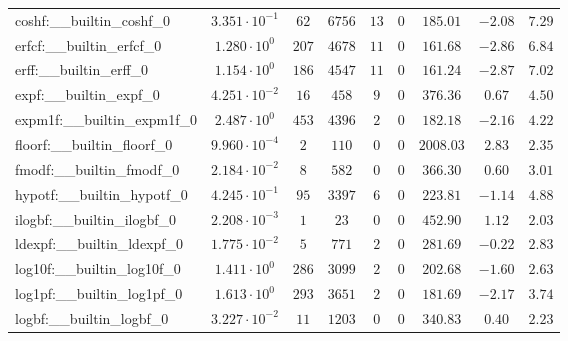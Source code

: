 \begin{tabular}{|l|c|c|c|c|c|c|c|c|}
coshf:\_\_builtin\_coshf\_0               & $ 3.351 \cdot 10^{-1} $ & $ 62     $ & $ 6756   $ & $ 13  $ & $ 0   $ & $ 185.01      $ & $ -2.08   $ & $ 7.29    $ \\
erfcf:\_\_builtin\_erfcf\_0               & $ 1.280 \cdot 10^{0}  $ & $ 207    $ & $ 4678   $ & $ 11  $ & $ 0   $ & $ 161.68      $ & $ -2.86   $ & $ 6.84    $ \\
erff:\_\_builtin\_erff\_0                 & $ 1.154 \cdot 10^{0}  $ & $ 186    $ & $ 4547   $ & $ 11  $ & $ 0   $ & $ 161.24      $ & $ -2.87   $ & $ 7.02    $ \\
expf:\_\_builtin\_expf\_0                 & $ 4.251 \cdot 10^{-2} $ & $ 16     $ & $ 458    $ & $ 9   $ & $ 0   $ & $ 376.36      $ & $ 0.67    $ & $ 4.50    $ \\
expm1f:\_\_builtin\_expm1f\_0             & $ 2.487 \cdot 10^{0}  $ & $ 453    $ & $ 4396   $ & $ 2   $ & $ 0   $ & $ 182.18      $ & $ -2.16   $ & $ 4.22    $ \\
floorf:\_\_builtin\_floorf\_0             & $ 9.960 \cdot 10^{-4} $ & $ 2      $ & $ 110    $ & $ 0   $ & $ 0   $ & $ 2008.03     $ & $ 2.83    $ & $ 2.35    $ \\
fmodf:\_\_builtin\_fmodf\_0               & $ 2.184 \cdot 10^{-2} $ & $ 8      $ & $ 582    $ & $ 0   $ & $ 0   $ & $ 366.30      $ & $ 0.60    $ & $ 3.01    $ \\
hypotf:\_\_builtin\_hypotf\_0             & $ 4.245 \cdot 10^{-1} $ & $ 95     $ & $ 3397   $ & $ 6   $ & $ 0   $ & $ 223.81      $ & $ -1.14   $ & $ 4.88    $ \\
ilogbf:\_\_builtin\_ilogbf\_0             & $ 2.208 \cdot 10^{-3} $ & $ 1      $ & $ 23     $ & $ 0   $ & $ 0   $ & $ 452.90      $ & $ 1.12    $ & $ 2.03    $ \\
ldexpf:\_\_builtin\_ldexpf\_0             & $ 1.775 \cdot 10^{-2} $ & $ 5      $ & $ 771    $ & $ 2   $ & $ 0   $ & $ 281.69      $ & $ -0.22   $ & $ 2.83    $ \\
log10f:\_\_builtin\_log10f\_0             & $ 1.411 \cdot 10^{0}  $ & $ 286    $ & $ 3099   $ & $ 2   $ & $ 0   $ & $ 202.68      $ & $ -1.60   $ & $ 2.63    $ \\
log1pf:\_\_builtin\_log1pf\_0             & $ 1.613 \cdot 10^{0}  $ & $ 293    $ & $ 3651   $ & $ 2   $ & $ 0   $ & $ 181.69      $ & $ -2.17   $ & $ 3.74    $ \\
logbf:\_\_builtin\_logbf\_0               & $ 3.227 \cdot 10^{-2} $ & $ 11     $ & $ 1203   $ & $ 0   $ & $ 0   $ & $ 340.83      $ & $ 0.40    $ & $ 2.23    $ \\

\end{tabular}
